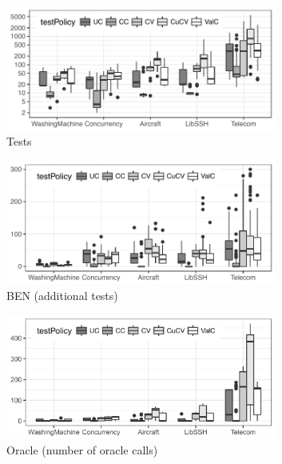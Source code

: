 \begin{tikzborder}{\cite{Gargantini16:validation}}
\begin{tikzborder}{\cite{gargantini_combinatorial_2017}}
\begin{figure}
	\centering
	\begin{subfigure}[b]{0.49\textwidth}
		\includegraphics[width=0.98\textwidth]{data/initTests.pdf}
		\caption{Tests}\label{fig:initTests}
	\end{subfigure}
	\begin{subfigure}[b]{0.49\textwidth}
		\centering
		\includegraphics[width=0.98\textwidth]{data/BENTests.pdf}
		\caption{BEN (additional tests)}\label{fig:ben}
	\end{subfigure}
	\begin{subfigure}[b]{0.49\textwidth}
		\centering
		\includegraphics[width=0.98\textwidth]{data/oraclecalls.png}
		\caption{Oracle (number of oracle calls)}
	\end{subfigure}
	\begin{subfigure}[b]{0.49\textwidth}

\end{subfigure}
\end{figure}
\end{tikzborder}
\end{tikzborder}

